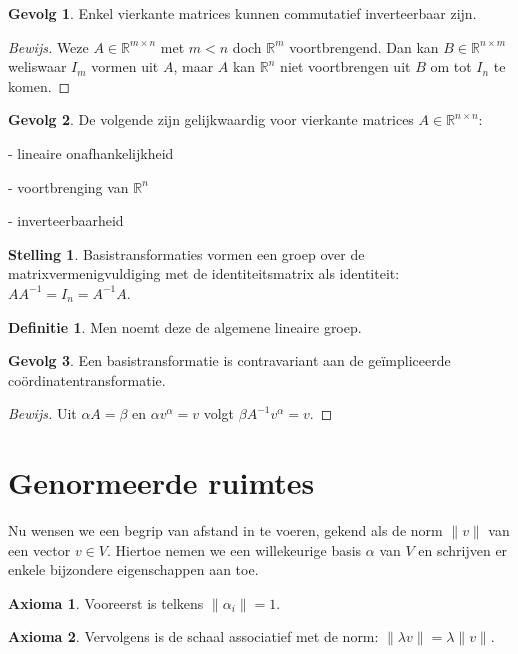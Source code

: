 \documentclass{amsart}
\theoremstyle{definition}
\newtheorem{axm}{Axioma}[section]
\newtheorem{thm}{Stelling}[section]
\newtheorem{dfn}{Definitie}[section]
\newtheorem{csq}{Gevolg}[section]
\newenvironment{bewijs}{\begin{proof}[Bewijs]}{\end{proof}}
\newcommand{\realnums}{\mathbb{R}}
\newcommand{\realn}[1][n]{\realnums^{#1}}
\newcommand{\realmx}[2][n]{\realn[#2 \times #1]}
\newcommand{\realnxn}{\realmx{n}}
\newcommand{\realmxn}{\realmx{m}}
\newcommand{\norm}[1]{\lVert#1\rVert}
\begin{document}
\begin{csq}
	Enkel vierkante matrices kunnen commutatief inverteerbaar zijn.
	\begin{bewijs}
		Weze $A \in \realmxn$ met $m < n$ doch $\realn[m]$ voortbrengend.
		Dan kan $B \in \realmx[m]{n}$ weliswaar $I_m$ vormen uit $A$, maar $A$ kan $\realn$ niet voortbrengen uit $B$ om tot $I_n$ te komen.
	\end{bewijs}
\end{csq}

\begin{csq}
	De volgende zijn gelijkwaardig voor vierkante matrices $A \in \realnxn$:

	- lineaire onafhankelijkheid

	- voortbrenging van $\realn$

	- inverteerbaarheid
\end{csq}

\begin{thm}
	Basistransformaties vormen een groep over de matrixvermenigvuldiging met de identiteitsmatrix als identiteit: $AA^{-1} = I_n = A^{-1}A$.
\end{thm}

\begin{dfn}
	Men noemt deze de algemene lineaire groep.
\end{dfn}

\begin{csq}
	Een basistransformatie is contravariant aan de ge\"{i}mpliceerde co\"{o}rdinatentransformatie. 
	\begin{bewijs}
		Uit $\alpha A = \beta$ en $\alpha v^\alpha = v$ volgt $\beta A^{-1} v^\alpha = v$.
	\end{bewijs}
\end{csq}

\section{Genormeerde ruimtes}

Nu wensen we een begrip van afstand in te voeren, gekend als de norm $\norm{v}$ van een vector $v \in V$. Hiertoe nemen we een willekeurige basis $\alpha$ van $V$ en schrijven er enkele bijzondere eigenschappen aan toe.
\begin{axm}
	Vooreerst is telkens $\norm{\alpha_i} = 1$.
\end{axm}

\begin{axm}
	Vervolgens is de schaal associatief met de norm: $\norm{\lambda v} = \lambda\norm v$.
\end{axm}
\end{document}
